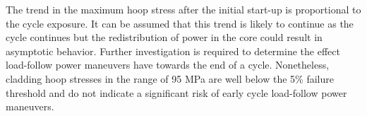 \documentclass[edeposit,fullpage,11pt]{uiucthesis2009}
\begin{document}
The trend in the maximum hoop stress after the initial start-up is proportional to the cycle exposure.
It can be assumed that this trend is likely to continue as the cycle continues but the redistribution of power in the core could result in asymptotic behavior.
Further investigation is required to determine the effect load-follow power maneuvers have towards the end of a cycle.
Nonetheless, cladding hoop stresses in the range of 95 MPa are well below the 5\% failure threshold and do not indicate a significant risk of early cycle load-follow power maneuvers. 

\begin{table}
\caption{Maximum clad hoop stress for each load-follow power maneuver}
\label{tab:MHS}
\begin{center}
\end{center}
\end{table}
\end{document}
